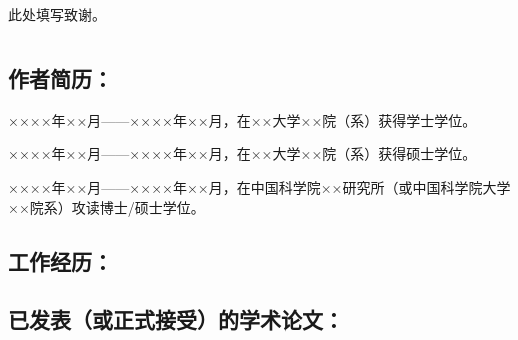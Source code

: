
{
    \chapter[\acknowledgeNameMark]{\acknowledgeName}
}

此处填写致谢。

\lipsum[1-3]


\cleardoublepage[plain]

{
    \chapter[\achievementNameMark]{\achievementName}
}

\section*{作者简历：}
××××年××月——××××年××月，在××大学××院（系）获得学士学位。

××××年××月——××××年××月，在××大学××院（系）获得硕士学位。

××××年××月——××××年××月，在中国科学院××研究所（或中国科学院大学××院系）攻读博士/硕士学位。

\section*{工作经历：}

\lipsum[1-2]

\section*{已发表（或正式接受）的学术论文：}

